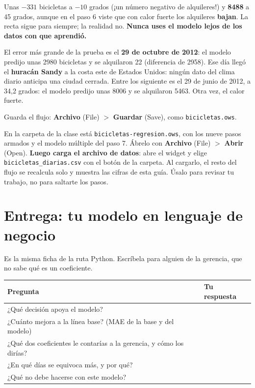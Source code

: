 \documentclass[11pt]{article}
\newcommand{\menu}[2]{\textbf{#1} {\color{black!55}(#2)}}
\newcommand{\widget}[1]{\leavevmode{\color{esumerNavyDark}\textbf{#1}}}
\newcommand{\py}[1]{\leavevmode{\color{esumerTeal}\textbf{[Python: #1]}}}
\begin{document}
\begin{control}
\small Unas \textbf{$-331$} bicicletas a $-10$ grados (¡un número negativo
de alquileres!) y \textbf{8488} a 45 grados, aunque en el paso 6 viste que
con calor fuerte los alquileres \textbf{bajan}. La recta sigue para siempre;
la realidad no. \textbf{Nunca uses el modelo lejos de los datos con que
aprendió.}

El error más grande de la prueba es el \textbf{29 de octubre de 2012}: el
modelo predijo unas 2980 bicicletas y se alquilaron 22 (diferencia de 2958).
Ese día llegó el \textbf{huracán Sandy} a la costa este de Estados Unidos:
ningún dato del clima diario anticipa una ciudad cerrada. Entre los
siguiente es el 29 de junio de 2012, a 34,2 grados: el modelo predijo unas
8006 y se alquilaron 5463. Otra vez, el calor fuerte.
\py{\texttt{prueba.sort\_values("error")}}
\end{control}

Guarda el flujo: \menu{Archivo}{File} $>$ \menu{Guardar}{Save}, como
\texttt{bicicletas.ows}.

\begin{recuerda}
\small En la carpeta de la clase está \texttt{bicicletas-regresion.ows}, con
los nueve pasos armados y el modelo múltiple del paso 7. Ábrelo con
\menu{Archivo}{File} $>$ \menu{Abrir}{Open}. \textbf{Luego carga el
archivo de datos}: abre el widget \widget{File} y elige
\texttt{bicicletas\_diarias.csv} con el botón de la carpeta. Al cargarlo, el
resto del flujo se recalcula solo y muestra las cifras de esta guía. Úsalo
para revisar tu trabajo, no para saltarte los pasos.
\end{recuerda}

\clearpage
\section*{\color{esumerNavy}Entrega: tu modelo en lenguaje de negocio}

Es la misma ficha de la ruta Python. Escríbela para alguien de la gerencia,
que no sabe qué es un coeficiente.

\renewcommand{\arraystretch}{3.0}
\begin{tabularx}{\textwidth}{@{}>{\raggedright\arraybackslash}p{6.2cm} >{\raggedright\arraybackslash}X@{}}
\toprule
\textbf{Pregunta} & \textbf{Tu respuesta}\\
\midrule
¿Qué decisión apoya el modelo? & \\ \hline
¿Cuánto mejora a la línea base? (MAE de la base y del modelo) & \\ \hline
¿Qué dos coeficientes le contarías a la gerencia, y cómo los dirías? & \\ \hline
¿En qué días se equivoca más, y por qué? & \\ \hline
¿Qué no debe hacerse con este modelo? & \\
\bottomrule
\end{tabularx}\par
\renewcommand{\arraystretch}{1.0}
\end{document}
